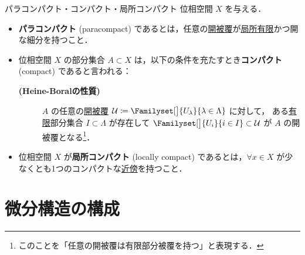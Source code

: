 \documentclass[geometry_main]{subfiles}
\begin{document}
\begin{mydef}[label=def:compacts]{パラコンパクト・コンパクト・局所コンパクト}
    位相空間 $X$ を与える．
	\begin{itemize}
		\item \textbf{パラコンパクト} (paracompact) であるとは，任意の\hyperref[def:cover]{開被覆}が\hyperref[def:cover]{局所有限}かつ開な細分を持つこと．
		\item 位相空間 $X$ の部分集合 $A \subset X$ は，以下の条件を充たすとき\textbf{コンパクト} (compact) であると言われる：
		\begin{description}
			\item[\textbf{(Heine-Boralの性質)}] $A$ の任意の\hyperref[def:cover]{開被覆} $\mathcal{U} \coloneqq \Familyset[\big]{U_\lambda}{\lambda \in \Lambda}$ に対して，
			ある\underline{有限}部分集合 $I \subset \Lambda$ が存在して $\Familyset[\big]{U_i}{i \in I} \subset \mathcal{U}$ が $A$ の開被覆となる\footnote{このことを「任意の開被覆は有限部分被覆を持つ」と表現する．}．
		\end{description}
		\item 位相空間 $X$ が\textbf{局所コンパクト} (locally compact) であるとは，$\forall x \in X$ が少なくとも1つのコンパクトな\hyperref[def:neighborhood]{近傍}を持つこと．
	\end{itemize}
\end{mydef}

\section{微分構造の構成}
\end{document}
